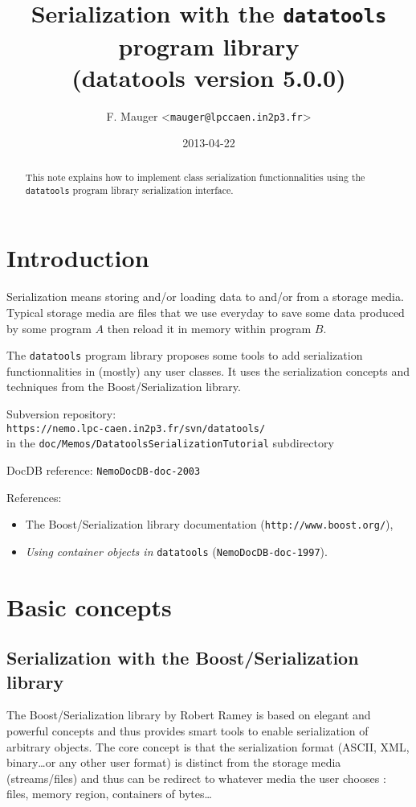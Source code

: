 \documentclass[a4paper,12pt]{article}
\title{Serialization with the \texttt{datatools} program library\\%
{\small{(datatools version 5.0.0)}}}
\author{F. Mauger <\texttt{mauger@lpccaen.in2p3.fr}>}
\date{2013-04-22}
\newcommand{\pn}{\par\noindent}
\begin{document}
\maketitle

\begin{abstract}
This   note   explains    how   to   implement   class   serialization
functionnalities   using   the   \texttt{datatools}  program   library
serialization interface.
\end{abstract}

\section{Introduction}

\pn Serialization means  storing and/or loading data to  and/or from a
storage media. Typical storage media are files that we use everyday to
save some data  produced by some program $A$ then  reload it in memory
within program $B$.

\pn The \texttt{datatools} program  library proposes some tools to add
serialization functionnalities in (mostly)  any user classes.  It uses
the serialization concepts and techniques from the Boost/Serialization
library.


\vskip 5mm
\pn
Subversion repository:\\
\texttt{https://nemo.lpc-caen.in2p3.fr/svn/datatools/} \\
in the \texttt{doc/Memos/DatatoolsSerializationTutorial} subdirectory
\pn
DocDB reference: \texttt{NemoDocDB-doc-2003}
\pn
References:
\begin{itemize}
\item The Boost/Serialization library documentation (\texttt{http://www.boost.org/}),
\item \textit{Using container objects in} \texttt{datatools}
(\texttt{NemoDocDB-doc-1997}).
\end{itemize}
\clearpage

\section{Basic concepts}

\subsection{Serialization with the Boost/Serialization  library}

The Boost/Serialization  library by Robert  Ramey is based  on elegant
and  powerful  concepts  and  thus  provides  smart  tools  to  enable
serialization  of arbitrary  objects.  The  core concept  is  that the
serialization  format  (ASCII,  XML,  binary\dots or  any  other  user
format) is  distinct from the  storage media (streams/files)  and thus
can be  redirect to  whatever media the  user chooses :  files, memory
region, containers of bytes\dots
\end{document}
